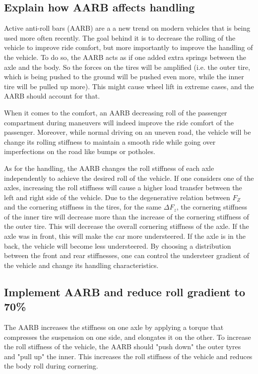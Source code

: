 \subsection{Explain how AARB affects handling}
Active anti-roll bars (AARB) are a a new trend on modern vehicles that is being used more often recently. The goal behind it is to decrease the rolling of the vehicle to improve ride comfort, but more importantly to improve the handling of the vehicle.
To do so, the AARB acts as if one added extra springs between the axle and the body. So the forces on the tires will be amplified (i.e. the outer tire, which is being pushed to the ground will be pushed even more, while the inner tire will be pulled up more). This might cause wheel lift in extreme cases, and the AARB should account for that.

When it comes to the comfort, an AARB decreasing roll of the passenger compartment during maneuvers will indeed improve the ride comfort of the passenger. Moreover, while normal driving on an uneven road, the vehicle will be change its rolling stiffness to maintain a smooth ride while going over imperfections on the road like bumps or potholes.

As for the handling, the AARB changes the roll stiffness of each axle independently to achieve the desired roll of the vehicle. If one considers one of the axles, increasing the roll stiffness will cause a higher load transfer between the left and right side of the vehicle. Due to the degenerative relation between $F_Z$ and the cornering stiffness in the tires, for the same $\Delta F_z$, the cornering stiffness of the inner tire will decrease more than the increase of the cornering stiffness of the outer tire. This will decrease the overall cornering stiffness of the axle. If the axle was in front, this will make the car more understeered. If the axle is in the back, the vehicle will become less understeered. By choosing  
a distribution between the front and rear stiffnesses, one can control the understeer gradient of the vehicle and change its handling characteristics.

\subsection{Implement AARB and reduce roll gradient to 70\%}

The AARB increases the stiffness on one axle by applying a torque that compresses the suspension on one side, and elongates it on the other. To increase the roll stiffness of the vehicle, the AARB should "push down" the outer tyres and "pull up" the inner. This increases the roll stiffness of the vehicle and reduces the body roll during cornering. 

